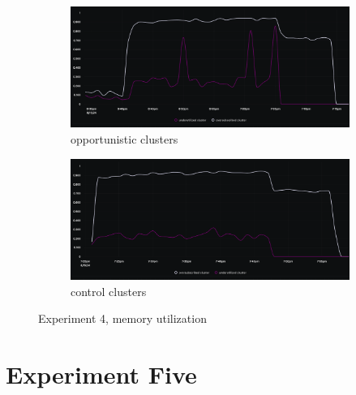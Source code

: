 \begin{figure}[H]
\centering
\begin{subfigure}{.5\textwidth}
  \centering
  \includegraphics[width=.9\linewidth]{./figures/experiment-four/exp4-incentives-2.png}
  \caption{opportunistic clusters}
  \label{fig:exp4oop}
\end{subfigure}%
\begin{subfigure}{.5\textwidth}
  \centering
  \includegraphics[width=.9\linewidth]{./figures/experiment-four/exp4-incentives-control-2.png}
  \caption{control clusters}
  \label{fig:exp4control}
\end{subfigure}
\caption{Experiment 4, memory utilization}
\label{fig:exp4memutil}
\end{figure}

\section{Experiment Five}

